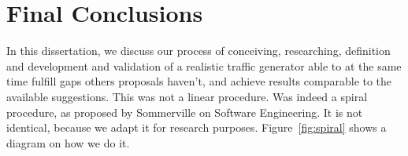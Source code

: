 




\section{Final Conclusions}


In this dissertation, we discuss our process of conceiving, researching, definition and development and validation of a realistic traffic generator able to at the same time fulfill gaps others proposals haven't, and achieve results comparable to the available suggestions. This was not a linear procedure. Was indeed a spiral procedure, as proposed by Sommerville on Software Engineering\cite{sommerville}. It is not identical, because we adapt it for research purposes. Figure~\ref{fig:spiral} shows a diagram on how we do it. 



